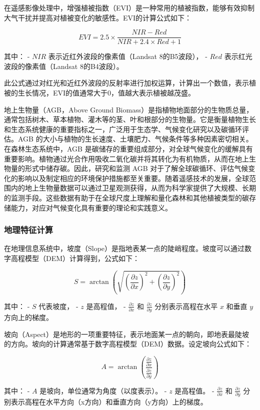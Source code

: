 \documentclass{article}
\begin{document}
		在遥感影像处理中，增强植被指数（EVI）是一种常用的植被指数，能够有效抑制大气干扰并提高对植被变化的敏感性。EVI的计算公式如下：
		
		\[
		EVI = 2.5 \times \frac{NIR - Red}{NIR + 2.4 \times Red + 1}
		\]
		
		其中：
		- \( NIR \) 表示近红外波段的像素值（Landsat 8的B5波段），
		- \( Red \) 表示红光波段的像素值（Landsat 8的B4波段）。
		
		此公式通过对红光和近红外波段的反射率进行加权运算，计算出一个数值，表示植被的生长情况，EVI的值通常大于0，值越大表示植被越茂盛。
		\par
		地上生物量（AGB，Above Ground Biomass）是指植物地面部分的生物质总量，通常包括树木、草本植物、灌木等的茎、叶和根部分的生物量。它是衡量植物生长和生态系统健康的重要指标之一，广泛用于生态学、气候变化研究以及碳循环评估。AGB 的大小与植物的生长速度、土壤肥力、气候条件等多种因素密切相关。在森林生态系统中，AGB 是碳储存的重要组成部分，对全球气候变化的缓解具有重要影响。植物通过光合作用吸收二氧化碳并将其转化为有机物质，从而在地上生物量的形式中储存碳。因此，研究和监测 AGB 对于了解全球碳循环、评估气候变化的影响以及制定相应的环境保护措施都至关重要。随着遥感技术的发展，全球范围内的地上生物量数据可以通过卫星观测获得，从而为科学家提供了大规模、长期的监测手段。这些数据有助于在全球尺度上理解和量化森林和其他植被类型的碳存储能力，对应对气候变化具有重要的理论和实践意义。
		\subsubsection{地理特征计算}
		
		在地理信息系统中，坡度（Slope）是指地表某一点的陡峭程度。坡度可以通过数字高程模型（DEM）计算得到，公式如下：
		
		\[
		S = \arctan \left( \sqrt{ \left( \frac{\partial z}{\partial x} \right)^2 + \left( \frac{\partial z}{\partial y} \right)^2 } \right)
		\]
		
		其中：
		- \( S \) 代表坡度，
		- \( z \) 是高程值，
		- \( \frac{\partial z}{\partial x} \) 和 \( \frac{\partial z}{\partial y} \) 分别表示高程在水平 \( x \) 和垂直 \( y \) 方向上的梯度。

		
		坡向（Aspect）是地形的一项重要特征，表示地面某一点的朝向，即地表最陡坡的方向。坡向的计算通常基于数字高程模型（DEM）数据。设定坡向公式如下：
		
		\[
		A = \arctan \left( \frac{ \frac{\partial z}{\partial x} }{ \frac{\partial z}{\partial y} } \right)
		\]
		
		其中：
		- \( A \) 是坡向，单位通常为角度（以度表示）。
		- \( z \) 是高程值。
		- \( \frac{\partial z}{\partial x} \) 和 \( \frac{\partial z}{\partial y} \) 分别表示高程在水平方向（x方向）和垂直方向（y方向）上的梯度。
		
\end{document}
